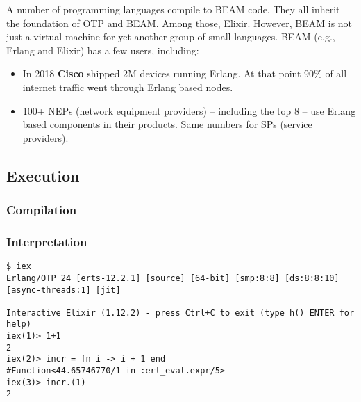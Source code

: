 {%
A number of programming languages compile to BEAM code. They all inherit the foundation of OTP and BEAM. Among those, Elixir. However, BEAM is not just a virtual machine for yet another group of small languages. BEAM (e.g., Erlang and Elixir) has a few users, including:
\begin{itemize}
   is using Elixir to scale to 5M concurrent users.
   uses Erlang to power its chat service serving 100M active users.
   uses Erlang to run messaging servers, each covering 2M users.
   uses Erlang for its GPRS, 3G, 4G and 5G infrastructure, and has a market share of 40\%.
  \item In 2018 \textbf{Cisco} shipped 2M devices running Erlang. At that point 90\% of all internet traffic went through Erlang based nodes.
  \item 100+ NEPs (network equipment providers) -- including the top 8 -- use Erlang based components in their products. Same numbers for SPs (service providers).
\end{itemize}

\subsection{Execution}
\subsubsection{Compilation}
\subsubsection{Interpretation}

\begin{verbatim}
$ iex
Erlang/OTP 24 [erts-12.2.1] [source] [64-bit] [smp:8:8] [ds:8:8:10] [async-threads:1] [jit]

Interactive Elixir (1.12.2) - press Ctrl+C to exit (type h() ENTER for help)
iex(1)> 1+1
2
iex(2)> incr = fn i -> i + 1 end
#Function<44.65746770/1 in :erl_eval.expr/5>
iex(3)> incr.(1)
2
\end{verbatim}

}
